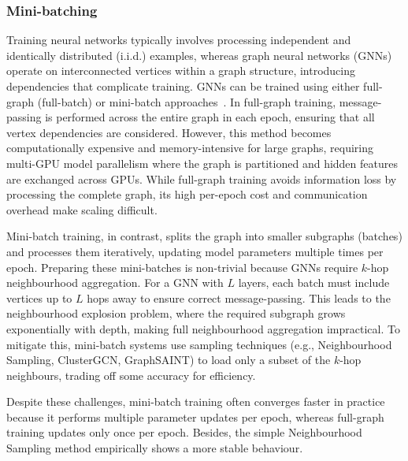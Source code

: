\subsubsection{Mini-batching}

Training neural networks typically involves processing independent and identically distributed (i.i.d.) examples, whereas graph neural networks (GNNs) operate on interconnected vertices within a graph structure, introducing dependencies that complicate training. GNNs can be trained using either full-graph (full-batch) or mini-batch approaches~\cite{bajaj2024graph}. In full-graph training, message-passing is performed across the entire graph in each epoch, ensuring that all vertex dependencies are considered. However, this method becomes computationally expensive and memory-intensive for large graphs, requiring multi-GPU model parallelism where the graph is partitioned and hidden features are exchanged across GPUs. While full-graph training avoids information loss by processing the complete graph, its high per-epoch cost and communication overhead make scaling difficult.

Mini-batch training, in contrast, splits the graph into smaller subgraphs (batches) and processes them iteratively, updating model parameters multiple times per epoch. Preparing these mini-batches is non-trivial because GNNs require $k$-hop neighbourhood aggregation. For a GNN with $L$ layers, each batch must include vertices up to $L$ hops away to ensure correct message-passing. This leads to the neighbourhood explosion problem, where the required subgraph grows exponentially with depth, making full neighbourhood aggregation impractical. To mitigate this, mini-batch systems use sampling techniques (e.g., Neighbourhood Sampling, ClusterGCN, GraphSAINT) to load only a subset of the $k$-hop neighbours, trading off some accuracy for efficiency. 

Despite these challenges, mini-batch training often converges faster in practice because it performs multiple parameter updates per epoch, whereas full-graph training updates only once per epoch. Besides, the simple Neighbourhood Sampling method empirically shows a more stable behaviour.

